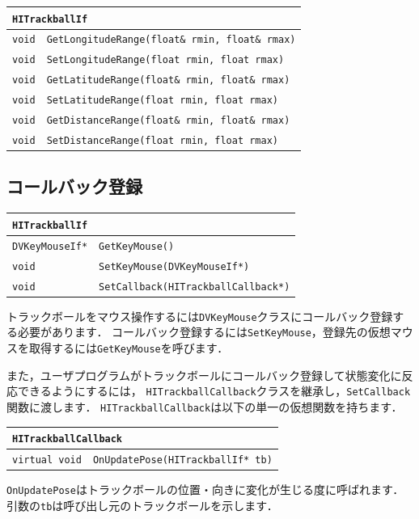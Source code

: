 \begin{center}
\begin{tabular}{p{.15\hsize}p{.75\hsize}}
\multicolumn{2}{l}{\texttt{HITrackballIf}}									\\ \midrule
\texttt{void} 	& \texttt{GetLongitudeRange(float\& rmin, float\& rmax)}	\\
\texttt{void} 	& \texttt{SetLongitudeRange(float rmin, float rmax)}		\\
\texttt{void} 	& \texttt{GetLatitudeRange(float\& rmin, float\& rmax)}		\\
\texttt{void} 	& \texttt{SetLatitudeRange(float rmin, float rmax)}			\\
\texttt{void} 	& \texttt{GetDistanceRange(float\& rmin, float\& rmax)}		\\
\texttt{void} 	& \texttt{SetDistanceRange(float rmin, float rmax)}			\\
\end{tabular}
\end{center}

\subsection*{\KLUDGE コールバック登録}

\begin{center}
\begin{tabular}{p{.2\hsize}p{.7\hsize}}
\multicolumn{2}{l}{\texttt{HITrackballIf}}								\\ \midrule
\texttt{DVKeyMouseIf*} 	& \texttt{GetKeyMouse()}						\\
\texttt{void} 			& \texttt{SetKeyMouse(DVKeyMouseIf*)}			\\
\texttt{void} 			& \texttt{SetCallback(HITrackballCallback*)}	\\
\end{tabular}
\end{center}

\KLUDGE トラックボールをマウス操作するには\texttt{DVKeyMouse}\KLUDGE クラスにコールバック登録する必要があります．
\KLUDGE コールバック登録するには\texttt{SetKeyMouse}\KLUDGE ，登録先の仮想マウスを取得するには\texttt{GetKeyMouse}\KLUDGE を呼びます．

\KLUDGE また，ユーザプログラムがトラックボールにコールバック登録して状態変化に反応できるようにするには，
\texttt{HITrackballCallback}\KLUDGE クラスを継承し，\texttt{SetCallback}\KLUDGE 関数に渡します．
\texttt{HITrackballCallback}\KLUDGE は以下の単一の仮想関数を持ちます．
\begin{center}
\begin{tabular}{p{.2\hsize}p{.7\hsize}}
\multicolumn{2}{l}{\texttt{HITrackballCallback}}					\\ \midrule
\texttt{virtual void} 	& \texttt{OnUpdatePose(HITrackballIf* tb)}	\\
\end{tabular}
\end{center}
\texttt{OnUpdatePose}\KLUDGE はトラックボールの位置・向きに変化が生じる度に呼ばれます．
\KLUDGE 引数の\texttt{tb}\KLUDGE は呼び出し元のトラックボールを示します．

